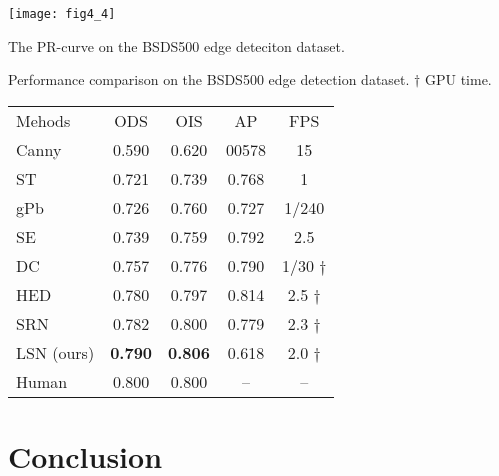 \documentclass[runningheads]{llncs}
\begin{document}
{
\setlength\parindent{-0.5em}
\vspace{1em}
\begin{minipage}{.45\textwidth}
\centering
\texttt{[image: fig4\_4]} 
\makeatletter\def\@captype{figure}\makeatother
\caption{The PR-curve on the BSDS500 edge deteciton dataset.}
\end{minipage} \quad
\begin{minipage}{.52\textwidth}
  \makeatletter{}\makeatother
  \caption{Performance comparison on the BSDS500 edge detection dataset. $\dagger$ GPU time.}
  \begin{tabular}{lcccc}
    \hline\noalign{\smallskip}
    Mehods & ODS & OIS & AP & FPS \\
    \noalign{\smallskip}
    \hline
    \noalign{\smallskip}
    Canny \cite{ref40} &	0.590 &	0.620 &	00578 &	15 \\
    ST \cite{ref39} & 0.721 &	0.739 &	0.768 &	1 \\
    gPb \cite{ref35} & 0.726 & 0.760 & 0.727 & 1/240 \\
    SE \cite{ref18} &	0.739 &	0.759 &	0.792 &	2.5 \\
    \hline
    DC \cite{ref18} &	0.757 &	0.776 &	0.790 &	1/30 $\dagger$ \\
    HED \cite{ref6} &	0.780 &	0.797 &	0.814 &	2.5 $\dagger$ \\
    SRN \cite{ref1} &	0.782 &	0.800 &	0.779 &	2.3 $\dagger$ \\
    LSN (ours) &	\textbf{0.790} & \textbf{0.806} &	0.618 &	2.0 $\dagger$ \\
    \hline
    Human &	0.800 &	0.800 &	-- & -- \\	
    \hline
 \end{tabular}    
  \label{fig:sklarge}
\end{minipage}
\vspace{1em}
}

\section{Conclusion}
\end{document}

